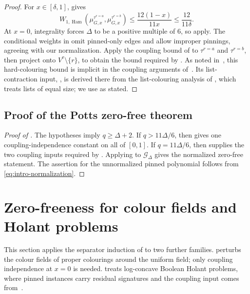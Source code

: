 \documentclass[11pt,reqno]{article}
\theoremstyle{plain}
\theoremstyle{definition}
\theoremstyle{remark}
\theoremstyle{definition}
\theoremstyle{remark}
\DeclareMathOperator{\Ham}{Ham}
\newcommand{\Deg}{\Delta}                        %
\newcommand{\WHam}{W_{1,\Ham}}                   %
\newcommand{\Gdeg}{\mathcal{G}_{\Deg}}
\newcommand{\mupin}[3]{\mu_{#1,#3}^{#2}}
\begin{document}
\begin{proof}
For \(x\in[\delta,1]\),  gives
\[
  \WHam\!\left(
    \mupin{G}{\tau^{r=a}}{x},
    \mupin{G}{\tau^{r=b}}{x}
  \right)
  \le \frac{12(1-x)}{11x}
  \le \frac{12}{11\delta}.
\]
At \(x=0\), integrality forces \(\Deg\) to be a positive multiple of \(6\),
so \cite[Theorem~20 and Proposition~22]{CFFGZZ2024} apply.
The conditional weights in \cite[Section~2]{CFFGZZ2024} omit pinned-only
edges and allow improper pinnings, agreeing with our normalization.
Apply the coupling bound of \cite[Theorem~20]{CFFGZZ2024} to
\(\tau^{r=a}\) and \(\tau^{r=b}\), then
project onto \(V^\tau\setminus\{r\}\), to obtain the bound required by
.  As noted in~\cite{CFFGZZ2024}, this hard-colouring
bound is implicit in the coupling arguments
of~\cite{Liu2021Coupling,BlancaEtAl2022Coupling}.  Its list-contraction
input, \cite[Proposition~22]{CFFGZZ2024}, is derived there from the
list-colouring analysis of \cite[Section~6 and Appendix~E]{CDMPP2019},
which treats lists of equal size; we use \cite[Theorem~20]{CFFGZZ2024}
as stated.
\end{proof}

\subsection{Proof of the Potts zero-free theorem}
\label{sec:main-proof}

\begin{proof}[Proof of ]
The hypotheses imply \(q\ge\Deg+2\).  If \(q>11\Deg/6\), then
 gives one coupling-independence constant on all of
\([0,1]\).  If \(q=11\Deg/6\), then 
supplies the two coupling inputs required by .
Applying  to \(\Gdeg\) gives the normalized
zero-free statement.  The assertion for the unnormalized pinned
polynomial follows from \eqref{eq:intro-normalization}.
\end{proof}

\section{Zero-freeness for colour fields and Holant problems}
\label{sec:other-applications}

This section applies the separator induction of
 to two further families.
 perturbs the colour fields of proper colourings
around the uniform field; only coupling independence at \(x=0\) is
needed.   treats log-concave Boolean Holant
problems, where pinned instances carry residual signatures and the
coupling input comes from~\cite{ChenGu2023}.
\end{document}

